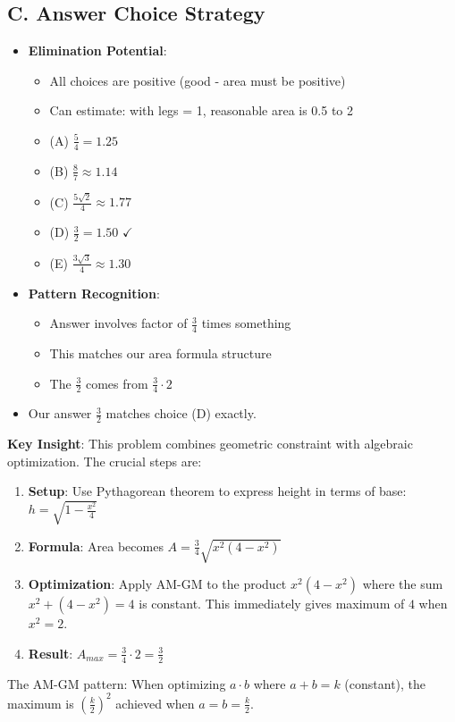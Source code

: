 \documentclass[12pt]{article}
\begin{document}
\begin{competitionbox}
\subsection*{C. Answer Choice Strategy}
\begin{itemize}[leftmargin=*]
    \item \textbf{Elimination Potential}:
    \begin{itemize}
        \item All choices are positive (good - area must be positive)
        \item Can estimate: with legs = 1, reasonable area is 0.5 to 2
        \item (A) $\frac{5}{4} = 1.25$
        \item (B) $\frac{8}{7} \approx 1.14$
        \item (C) $\frac{5\sqrt{2}}{4} \approx 1.77$
        \item (D) $\frac{3}{2} = 1.50$ $\checkmark$
        \item (E) $\frac{3\sqrt{3}}{4} \approx 1.30$
    \end{itemize}
    \item \textbf{Pattern Recognition}:
    \begin{itemize}
        \item Answer involves factor of $\frac{3}{4}$ times something
        \item This matches our area formula structure
        \item The $\frac{3}{2}$ comes from $\frac{3}{4} \cdot 2$
    \end{itemize}
    \item Our answer $\frac{3}{2}$ matches choice (D) exactly.
\end{itemize}
\end{competitionbox}

\begin{keyinsightbox}
\textbf{Key Insight}: This problem combines geometric constraint with algebraic optimization. The crucial steps are:

\begin{enumerate}
    \item \textbf{Setup}: Use Pythagorean theorem to express height in terms of base: $h = \sqrt{1 - \frac{x^2}{4}}$
    
    \item \textbf{Formula}: Area becomes $A = \frac{3}{4}\sqrt{x^2(4-x^2)}$
    
    \item \textbf{Optimization}: Apply AM-GM to the product $x^2(4-x^2)$ where the sum $x^2 + (4-x^2) = 4$ is constant. This immediately gives maximum of $4$ when $x^2 = 2$.
    
    \item \textbf{Result}: $A_{max} = \frac{3}{4} \cdot 2 = \frac{3}{2}$
\end{enumerate}

The AM-GM pattern: When optimizing $a \cdot b$ where $a + b = k$ (constant), the maximum is $\left(\frac{k}{2}\right)^2$ achieved when $a = b = \frac{k}{2}$.
\end{keyinsightbox}
\end{document}
